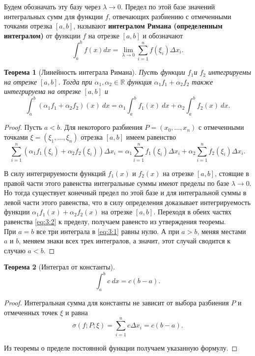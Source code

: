 \documentclass[12pt]{article}
\numberwithin{equation}{section}
\newtheorem{theorem}{Теорема}[section]
\begin{document}
Будем обозначать эту базу через $\lambda \to 0$. Предел по этой базе значений интегральных сумм для функции $f$, отвечающих разбиению с отмеченными точками отрезка $[a,b]$, называют \textbf{интегралом Римана (определенным интегралом)} от функции $f$ на отрезке $[a,b]$ и обозначают
\[ \int_{a}^b f(x) dx = \lim_{\lambda \to 0}\sum_{i=1}^n f(\xi_i) \Delta x_i.\]

\begin{theorem}[Линейность интеграла Римана] Пусть функции $f_1$и $f_2$ интегрируемы на отрезке $[a,b]$. Тогда при $\alpha_1, \alpha_2 \in \mathbb{R}$ функция $\alpha_1 f_1 + \alpha_2 f_2 $ также интегрируема на отрезке $[a,b]$ и 
\begin{equation}
\int_a^b (\alpha_1 f_1 + \alpha_2 f_2) (x) ~dx = \alpha_1 \int_a^b f_1(x) ~dx + \alpha_2 \int_a^b f_2(x)~dx. \label{eq:3:1}
\end{equation}
\end{theorem}
\begin{proof} Пусть $a < b$. Для некоторого разбиения $P = (x_0, \ldots, x_n)$ с отмеченными точками $\xi = (\xi_1, \ldots, \xi_n)$ отрезка $[a,b]$ имеем равенство
\begin{equation}
\sum_{i=1}^n(\alpha_1f_1(\xi_i) + \alpha_2 f_2 (\xi_i))\Delta x_i = \alpha_1 \sum_{i=1}^n f_1 (\xi_i) \Delta x_i + \alpha_2 \sum_{i=1}^n f_2 (\xi_i) \Delta x_i.\label{eq:3:2}
\end{equation}

В силу интегрируемости функций $f_1(x)$ и $f_2(x)$ на отрезке $[a,b]$, стоящие в правой части этого равенства интегральные суммы имеют пределы по базе $\lambda \to 0$. Но тогда существует конечный предел по этой базе и для интегральной суммы в левой части этого равенства, что в силу определения доказывает интегрируемость функции $\alpha_1f_1(x) + \alpha_2 f_2(x)$ на отрезке $[a,b]$. Переходя в обеих частях равенства \eqref{eq:3:2} к пределу, получаем равенсто из утверждения теоремы.\\

При $a = b$ все три интеграла в \eqref{eq:3:1} равны нулю. А при $a > b$, меняя местами $a$ и $b$, меняем знаки всех трех интегралов, а значит, этот случай сводится к случаю $a < b$.
\end{proof}

\begin{theorem}[Интеграл от константы]
\[ \int_a^b c~dx = c(b-a).\]
\end{theorem}
\begin{proof}
Интегральная сумма для константы не зависит от выбора разбиения $P$ и отмеченных точек $\xi$ и равна
\[ \sigma(f;P;\xi) = \sum_{i=1}^n c\Delta x_i = c(b-a).\]

Из теоремы о пределе постоянной функции получаем указанную формулу.
\end{proof}
\end{document}

